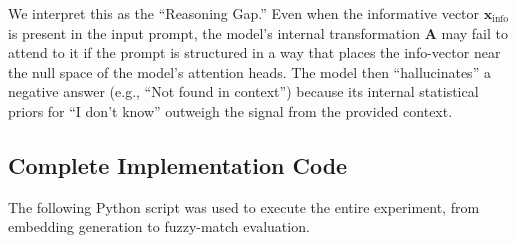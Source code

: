 \documentclass[12pt,a4paper]{article}
\begin{document}
We interpret this as the ``Reasoning Gap.'' Even when the informative vector $\mathbf{x}_{\text{info}}$ is present in the input prompt, the model's internal transformation $\mathbf{A}$ may fail to attend to it if the prompt is structured in a way that places the info-vector near the null space of the model's attention heads. The model then ``hallucinates'' a negative answer (e.g., ``Not found in context'') because its internal statistical priors for ``I don't know'' outweigh the signal from the provided context.

\subsection{Complete Implementation Code}
The following Python script was used to execute the entire experiment, from embedding generation to fuzzy-match evaluation.
\end{document}
